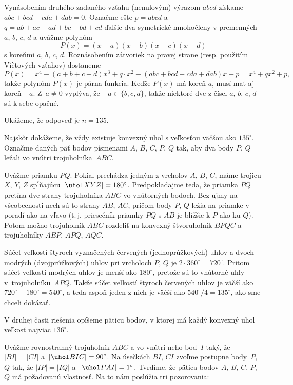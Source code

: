{\ineriesenie
Vynásobením druhého zadaného vzťahu (nenulovým) výrazom $abcd$ získame $abc+bcd+cda+dab=0$. Označme ešte $p=abcd$ a $q=ab+ac+ad+bc+bd+cd$ ďalšie dva symetrické mnohočleny v premenných $a$, $b$, $c$, $d$ a uvážme polynóm
$$ P(x)=(x-a)(x-b)(x-c)(x-d) $$
s koreňmi $a$, $b$, $c$, $d$.
Roznásobením zátvoriek na pravej strane (resp. použitím Vi\`etových vzťahov) dostaneme
$$
P(x)=x^4-(a+b+c+d)x^3+ q\cdot x^2-(abc+bcd+cda+dab)x+p
=x^4+qx^2+p,$$
takže polynóm $P(x)$ je párna funkcia. Keďže $P(x)$ má koreň $a$, musí mať aj koreň ${-a}$. Z~$a\ne 0$ vyplýva, že ${-a}\in \{b,c,d\}$, takže niektoré dve z čísel $a$, $b$, $c$, $d$ sú k sebe opačné.
}

{%
Ukážeme, že odpoveď je $n=135$.

Najskôr dokážeme, že vždy existuje konvexný uhol s veľkosťou väčšou ako $135^\circ$.
Označme daných päť bodov písmenami $A$, $B$, $C$, $P$, $Q$ tak, aby dva body $P$, $Q$ ležali vo vnútri trojuholníka~$ABC$.

Uvážme priamku $PQ$. Pokiaľ prechádza jedným z vrcholov $A$, $B$, $C$, máme trojicu $X$, $Y$, $Z$ spĺňajúcu $|\uhol XYZ|=180^\circ$. Predpokladajme teda, že priamka $PQ$ pretína dve strany trojuholníka $ABC$ vo vnútorných bodoch. Bez ujmy na všeobecnosti nech sú to strany $AB$, $AC$, pričom body $P$, $Q$ ležia na priamke v poradí ako na \obr{} vľavo (t.\,j. priesečník priamky $PQ$ s $AB$ je bližšie k $P$ ako ku $Q$). Potom možno trojuholník $ABC$ rozdeliť na konvexný štvoruholník $BPQC$ a trojuholníky $ABP$, $APQ$, $AQC$.
%

Súčet veľkostí štyroch vyznačených červených (jednoprúžkových) uhlov a dvoch modrých (dvojprúžkových) uhlov pri vrcholoch $P$, $Q$ je $2\cdot 360^\circ=720^\circ$. Pritom súčet veľkostí modrých uhlov je menší ako $180^\circ$, pretože sú to vnútorné uhly v~trojuholníku~$APQ$. Takže súčet veľkostí štyroch červených uhlov je väčší ako $720^\circ-180^\circ=540^\circ$, a teda aspoň jeden z nich je väčší ako $540^\circ/4=135^\circ$, ako sme chceli dokázať.

V druhej časti riešenia opíšeme päticu bodov, v ktorej má každý konvexný uhol veľkosť najviac $136^\circ$.

Uvážme rovnostranný trojuholník $ABC$ a vo vnútri neho bod~$I$ taký, že $|BI|=|CI|$ a~$|\uhol BIC|=90^\circ$.
Na úsečkách $BI$, $CI$ zvoľme postupne body~$P$, $Q$ tak, že $|IP|=|IQ|$ a~$|\uhol PAI|=1^\circ$.
Tvrdíme, že pätica bodov $A$, $B$, $C$, $P$, $Q$ má požadovanú vlastnosť.
Na to nám poslúžia tri pozorovania:

}
